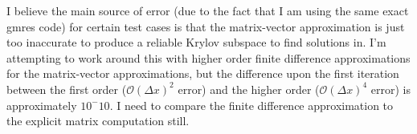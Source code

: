 I believe the main source of error (due to the fact that I am using the same exact gmres code)
for certain test cases is that the matrix-vector approximation is just too inaccurate to
produce a reliable Krylov subspace to find solutions in. I'm attempting to work around this with
higher order finite difference approximations for the matrix-vector approximations, but the difference
upon the first iteration between the first order ($\mathcal{O}(\Delta x)^2$ error) and the higher
order ($\mathcal{O}(\Delta x)^4$ error) is approximately $10^-10$. I need to compare the finite difference
approximation to the explicit matrix computation still. 